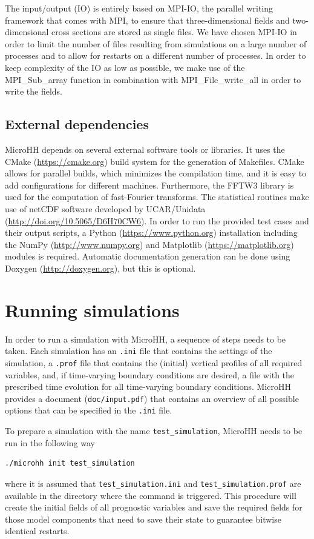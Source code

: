 \documentclass[gmd,manuscript]{copernicus}
\begin{document}
The input/output (IO) is entirely based on MPI-IO, the parallel writing framework that comes with MPI, to ensure that three-dimensional fields and two-dimensional cross sections are stored as single files. We have chosen MPI-IO in order to limit the number of files resulting from simulations on a large number of processes and to allow for restarts on a different number of processes. In order to keep complexity of the IO as low as possible, we make use of the MPI\_Sub\_array function in combination with MPI\_File\_write\_all in order to write the fields.

\subsection{External dependencies}
MicroHH depends on several external software tools or libraries. It uses the CMake (\url{https://cmake.org}) build system for the generation of Makefiles. CMake allows for parallel builds, which minimizes the compilation time, and it is easy to add configurations for different machines. Furthermore, the FFTW3 library \citep{Frigo2005} is used for the computation of fast-Fourier transforms. The statistical routines make use of netCDF software developed by UCAR/Unidata (\url{http://doi.org/10.5065/D6H70CW6}). In order to run the provided test cases and their output scripts, a Python (\url{https://www.python.org}) installation including the NumPy (\url{http://www.numpy.org}) and Matplotlib (\url{https://matplotlib.org}) modules is required. Automatic documentation generation can be done using Doxygen (\url{http://doxygen.org}), but this is optional.

\section{Running simulations}\label{sec:running}
\label{sec:running_simulations}
In order to run a simulation with MicroHH, a sequence of steps needs to be taken. Each simulation has an \texttt{.ini} file that contains the settings of the simulation, a \texttt{.prof} file that contains the (initial) vertical profiles of all required variables, and, if time-varying boundary conditions are desired, a file with the prescribed time evolution for all time-varying boundary conditions. MicroHH provides a document (\texttt{doc/input.pdf}) that contains an overview of all possible options that can be specified in the \texttt{.ini} file.

To prepare a simulation with the name \texttt{test\_simulation}, MicroHH needs to be run in the following way
\begin{verbatim}
./microhh init test_simulation
\end{verbatim}
where it is assumed that \texttt{test\_simulation.ini} and \texttt{test\_simulation.prof} are available in the directory where the command is triggered. This procedure will create the initial fields of all prognostic variables and save the required fields for those model components that need to save their state to guarantee bitwise identical restarts. 
\end{document}
